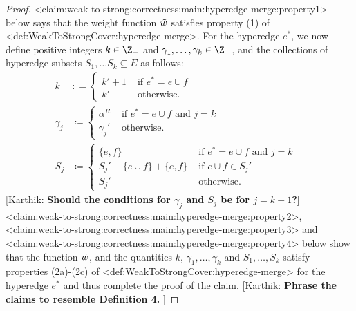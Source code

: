 \documentclass{article}
\def\Cref#1{<#1>}%
\newcommand{\knote}[1]{{\color{red}[{\tiny Karthik: \bf #1}]\marginpar{\color{red}*}}}
\begin{document}
\begin{proof}
    \Cref{claim:weak-to-strong:correctness:main:hyperedge-merge:property1} below says that the weight function $\Tilde{w}$ satisfies property (1) of \Cref{def:WeakToStrongCover:hyperedge-merge}. For the hyperedge $e^*$, we now define positive integers $k \in \Z_+$ and $\gamma_1, \ldots, \gamma_{k} \in \Z_+$, and the collections of hyperedge subsets $S_1, \ldots S_{k} \subseteq E$ as follows:
    \begin{align*}
        k &: =\begin{cases}
            k' + 1& \text{ if } e^* = e\cup f\\
            k'&\text{ otherwise.}
        \end{cases}&\\
        \gamma_j&\coloneqq  \begin{cases}
            \alpha^R& \text{ if } e^* = e\cup f \text{ and } j = k\\
            \gamma_j'&\text{ otherwise}.
        \end{cases}&\\
        S_j& \coloneqq  \begin{cases}
            \{e, f\}&\text{ if } e^* = e\cup f \text{ and } j = k\\
            S_j' - \{e\cup f\} + \{e, f\}&\text{ if } e\cup f \in S_j'\\
            S_j'& \text{ otherwise.}
        \end{cases}&
    \end{align*}
    \knote{Should the conditions for $\gamma_j$ and $S_j$ be for $j=k+1$?} 
    \Cref{claim:weak-to-strong:correctness:main:hyperedge-merge:property2}, \Cref{claim:weak-to-strong:correctness:main:hyperedge-merge:property3} and \Cref{claim:weak-to-strong:correctness:main:hyperedge-merge:property4} below show that the function $\Tilde{w}$, and the quantities $k$, $\gamma_1, \ldots, \gamma_k$ and $S_1, \ldots, S_k$ satisfy properties (2a)-(2c) of \Cref{def:WeakToStrongCover:hyperedge-merge} for the hyperedge $e^*$ and thus complete the proof of the claim. \knote{Phrase the claims to resemble Definition 4. }
\end{proof}
\end{document}
